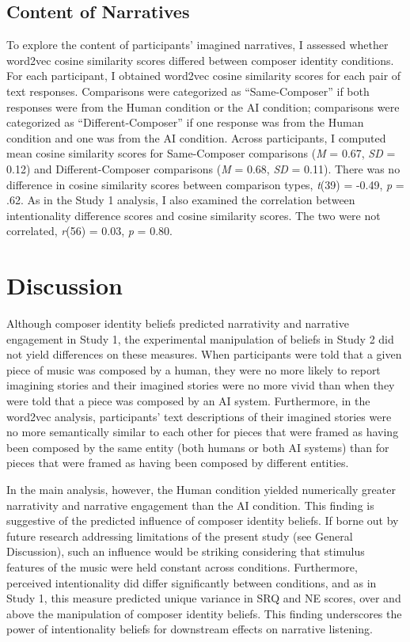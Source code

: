 \documentclass[12pt,twoside]{reedthesis}
\begin{document}
\subsection{Content of Narratives}
To explore the content of participants’ imagined narratives, I assessed whether word2vec cosine similarity scores differed between composer identity conditions. For each participant, I obtained word2vec cosine similarity scores for each pair of text responses. Comparisons were categorized as “Same-Composer” if both responses were from the Human condition or the AI condition; comparisons were categorized as “Different-Composer” if one response was from the Human condition and one was from the AI condition. Across participants, I computed mean cosine similarity scores for Same-Composer comparisons (\emph{M} = 0.67, \emph{SD} = 0.12) and Different-Composer comparisons (\emph{M} = 0.68, \emph{SD} = 0.11). There was no difference in cosine similarity scores between comparison types, \emph{t}(39) = -0.49, \emph{p} = .62. As in the Study 1 analysis, I also examined the correlation between intentionality difference scores and cosine similarity scores. The two were not correlated, \emph{r}(56) = 0.03, \emph{p} = 0.80.

\section{Discussion}

Although composer identity beliefs predicted narrativity and narrative engagement in Study 1, the experimental manipulation of beliefs in Study 2 did not yield differences on these measures. When participants were told that a given piece of music was composed by a human, they were no more likely to report imagining stories and their imagined stories were no more vivid than when they were told that a piece was composed by an AI system. Furthermore, in the word2vec analysis, participants’ text descriptions of their imagined stories were no more semantically similar to each other for pieces that were framed as having been composed by the same entity (both humans or both AI systems) than for pieces that were framed as having been composed by different entities. 

In the main analysis, however, the Human condition yielded numerically greater narrativity and narrative engagement than the AI condition. This finding is suggestive of the predicted influence of composer identity beliefs. If borne out by future research addressing limitations of the present study (see General Discussion), such an influence would be striking considering that stimulus features of the music were held constant across conditions. Furthermore, perceived intentionality did differ significantly between conditions, and as in Study 1, this measure predicted unique variance in SRQ and NE scores, over and above the manipulation of composer identity beliefs. This finding underscores the power of intentionality beliefs for downstream effects on narrative listening. 
\end{document}
